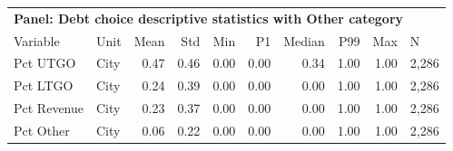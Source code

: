\begin{table}[H]
\centering
\begin{tabular*}{\textwidth}{@{\extracolsep{\fill}}llrrrrrrrl}
\multicolumn{10}{l}{\textbf{Panel: Debt choice descriptive statistics with Other category}}\\

\addlinespace
  \toprule
Variable & Unit & Mean & Std & Min & P1 & Median & P99 & Max & N \\ 
  \hline
Pct UTGO & City & 0.47 & 0.46 & 0.00 & 0.00 & 0.34 & 1.00 & 1.00 & 2,286 \\ 
  Pct LTGO & City & 0.24 & 0.39 & 0.00 & 0.00 & 0.00 & 1.00 & 1.00 & 2,286 \\ 
  Pct Revenue & City & 0.23 & 0.37 & 0.00 & 0.00 & 0.00 & 1.00 & 1.00 & 2,286 \\ 
  Pct Other & City & 0.06 & 0.22 & 0.00 & 0.00 & 0.00 & 1.00 & 1.00 & 2,286 \\ 
   \hline
\end{tabular*}
\end{table}
